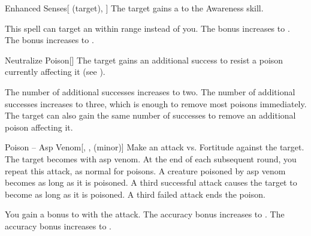 \lowercase{\hypertarget{spell:Enhanced Senses}{}}\label{spell:Enhanced Senses}
\begin{attuneability}[Rank 1]{\hypertarget{spell:Enhanced Senses}{Enhanced Senses}}[ (target), ]
The target gains a   to the Awareness skill.

\rankline
{} This spell can target an  within \rngmed range instead of you.
 The bonus increases to .
 The bonus increases to .

\end{attuneability}
\vspace{0.25em}



\lowercase{\hypertarget{spell:Neutralize Poison}{}}\label{spell:Neutralize Poison}
\begin{freeability}[Rank 1]{\hypertarget{spell:Neutralize Poison}{Neutralize Poison}}[]
The target gains an additional success to resist a poison currently affecting it (see ).

\rankline
{} The number of additional successes increases to two.
 The number of additional successes increases to three, which is enough to remove most poisons immediately.
 The target can also gain the same number of successes to remove an additional poison affecting it.

\end{freeability}
\vspace{0.25em}



\lowercase{\hypertarget{spell:Poison -- Asp Venom}{}}\label{spell:Poison -- Asp Venom}
\begin{freeability}[Rank 1]{\hypertarget{spell:Poison -- Asp Venom}{Poison -- Asp Venom}}[, ,  (minor)]
Make an attack vs. Fortitude against the target.
\hit The target becomes  with asp venom.
At the end of each subsequent round, you repeat this attack, as normal for poisons.
A creature poisoned by asp venom becomes  as long as it is poisoned.
A third successful attack causes the target to become  as long as it is poisoned.
A third failed attack ends the poison.

\rankline
{} You gain a  bonus to  with the attack.
 The accuracy bonus increases to .
 The accuracy bonus increases to .

\end{freeability}
\vspace{0.25em}




